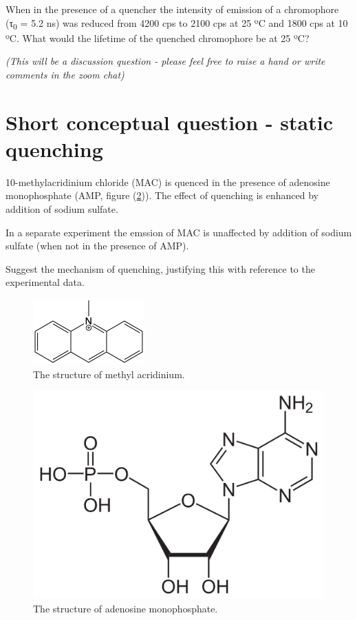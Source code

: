 \documentclass[
]{book}
\begin{document}
When in the presence of a quencher the intensity of emission of a chromophore (τ\textsubscript{0} = 5.2 ns) was reduced from 4200 cps to 2100 cps at 25 ºC and 1800 cps at 10 ºC. What would the lifetime of the quenched chromophore be at 25 ºC?

\emph{(This will be a discussion question - please feel free to raise a hand or write comments in the zoom chat)}

\hypertarget{sec:static2}{%
\section{Short conceptual question - static quenching}\label{sec:static2}}

10-methylacridinium chloride (MAC) is quenced in the presence of adenosine monophosphate (AMP, figure (\ref{fig:AMP})). The effect of quenching is enhanced by addition of sodium sulfate.

In a separate experiment the emssion of MAC is unaffected by addition of sodium sulfate (when not in the presence of AMP).

Suggest the mechanism of quenching, justifying this with reference to the experimental data.

\begin{figure}

{\centering \includegraphics[width=0.3\linewidth]{images/MAC} 

}

\caption{The structure of methyl acridinium.}\label{fig:MAC}
\end{figure}

\begin{figure}

{\centering \includegraphics[width=0.3\linewidth]{images/AMP} 

}

\caption{The structure of adenosine monophosphate.}\label{fig:AMP}
\end{figure}
\end{document}
